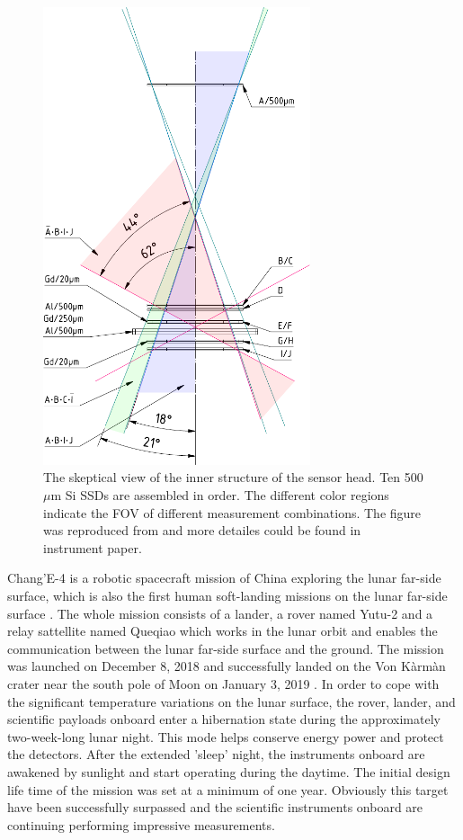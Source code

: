 \begin{figure}[!htbp]
    \centering
    \includegraphics[width = 0.7\textwidth, height = 0.5 \textheight]{images/change4_lnd-c9_trigger-cones-colored.pdf}
    \caption[The inner structure of LND sensor head]{The skeptical view of the inner structure of the sensor head. Ten 500 $\mu$m Si \acp{SSD} are assembled in order. The different color regions indicate the \ac{FOV} of different measurement combinations. The figure was reproduced from \citet{Wimmer-2020-LND} and more detailes could be found in instrument paper.}
    \label{Fig:LND_sensor_head}
\end{figure}
Chang'E-4 is a robotic spacecraft mission of China exploring the lunar far-side surface, which is also the first human soft-landing missions on the lunar far-side surface \citep{Li2021SSRv}. The whole mission consists of a lander, a rover named Yutu-2 and a relay sattellite named Queqiao which works in the lunar orbit and enables the communication between the lunar far-side surface and the ground. The mission was launched on December 8, 2018 and successfully landed on the Von K\`arm\`an crater near the south pole of Moon on January 3, 2019 \citep{Wu2019NatGe}. In order to cope with the significant temperature variations on the lunar surface, the rover, lander, and scientific payloads onboard enter a hibernation state during the approximately two-week-long lunar night. This mode helps conserve energy power and protect the detectors.  After the extended 'sleep' night, the instruments onboard are awakened by sunlight and start operating during the daytime. The initial design life time of the mission was set at a minimum of one year. Obviously this target have been successfully surpassed and the scientific instruments onboard are continuing performing impressive measurements.

